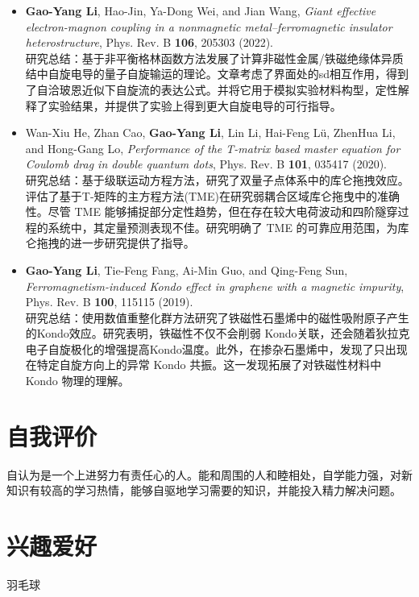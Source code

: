 \documentclass{resume}
\begin{document}
\begin{itemize}
\item \textbf{Gao-Yang Li}, Hao-Jin, Ya-Dong Wei, and Jian Wang, \textit{Giant effective electron-magnon coupling in a nonmagnetic metal–ferromagnetic insulator heterostructure}, Phys. Rev. B \textbf{106}, 205303 (2022).\\
研究总结：基于非平衡格林函数方法发展了计算非磁性金属/铁磁绝缘体异质结中自旋电导的量子自旋输运的理论。文章考虑了界面处的sd相互作用，得到了自洽玻恩近似下自旋流的表达公式。并将它用于模拟实验材料构型，定性解释了实验结果，并提供了实验上得到更大自旋电导的可行指导。
\item Wan-Xiu He, Zhan Cao, \textbf{Gao-Yang Li}, Lin Li, Hai-Feng Lü, ZhenHua Li, and Hong-Gang Lo, \textit{Performance of the T-matrix based master equation for Coulomb drag in double quantum dots}, Phys. Rev. B \textbf{101}, 035417 (2020).\\
研究总结：基于级联运动方程方法，研究了双量子点体系中的库仑拖拽效应。评估了基于T-矩阵的主方程方法(TME)在研究弱耦合区域库仑拖曳中的准确性。尽管 TME 能够捕捉部分定性趋势，但在存在较大电荷波动和四阶隧穿过程的系统中，其定量预测表现不佳。研究明确了 TME 的可靠应用范围，为库仑拖拽的进一步研究提供了指导。
\item \textbf{Gao-Yang Li}, Tie-Feng Fang, Ai-Min Guo, and Qing-Feng Sun, \textit{Ferromagnetism-induced Kondo effect in graphene with a magnetic impurity}, Phys. Rev. B \textbf{100}, 115115 (2019).\\
研究总结：使用数值重整化群方法研究了铁磁性石墨烯中的磁性吸附原子产生的Kondo效应。研究表明，铁磁性不仅不会削弱 Kondo关联，还会随着狄拉克电子自旋极化的增强提高Kondo温度。此外，在掺杂石墨烯中，发现了只出现在特定自旋方向上的异常 Kondo 共振。这一发现拓展了对铁磁性材料中 Kondo 物理的理解。
\end{itemize}


\section{自我评价}
\qquad 自认为是一个上进努力有责任心的人。能和周围的人和睦相处，自学能力强，对新知识有较高的学习热情，能够自驱地学习需要的知识，并能投入精力解决问题。

\section{兴趣爱好}
\qquad 羽毛球


%  
\end{document}
